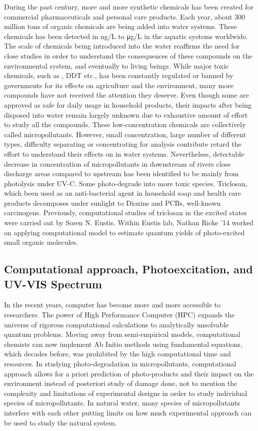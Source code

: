 \documentclass[
journal=jpcbfk, %
manuscript=article]{achemso}
\begin{document}
During the past century, more and more synthetic chemicals has been created for commercial pharmaceuticals and personal care products. Each year, about 300 million tons of organic chemicals are being added into water systems.\cite{Schwarzenbach2006} These chemicals has been detected in ng/L to μg/L in the aquatic systems worldwide.\cite{Monteiro2010} The scale of chemicals being introduced into the water reaffirms the need for close studies in order to understand the consequences of these compounds on the environmental system, and eventually to living beings. While major toxic chemicals, such as , DDT etc., has been constantly regulated or banned by governments for its effects on agriculture and the environment, many more compounds have not received the attention they deserve. Even though some are approved as safe for daily usage in household products, their impacts after being disposed into water remain largely unknown due to exhaustive amount of effort to study all the compounds. These low-concentration chemicals are collectively called micropollutants. However, small concentration, large number of different types, difficulty separating or concentrating for analysis contribute retard the effort to understand their effects on in water systems. Nevertheless, detectable decrease in concentration of micropollutants in downstream of rivers close discharge areas compared to upstream has been identified to be mainly from photolysis under UV-C.\cite{Conley2008,Daneshvar2010,Bonvin2011,Carlson2015} Some photo-degrade into more toxic species. Triclosan, which been used as an anti-bacterial agent in household soap and health care products decomposes under sunlight to Dioxins and PCBs, well-known carcinogens.\cite{Bedoux2012} Previously, computational studies of triclosan in the excited states were carried out by Soren N. Eustis.\cite{Kliegman2013} Within Eustis lab, Nathan Ricke '14 worked on applying computational model to estimate quantum yields of photo-excited small organic molecules.\cite{Ricke2014} 

\subsection{Computational approach, Photoexcitation, and UV-VIS Spectrum}
In the recent years, computer has become more and more accessible to researchers.\cite{Dykstra2011} The power of High Performance Computer (HPC) expands the universe of rigorous computational calculations to analytically unsolvable quantum problems. Moving away from semi-empirical models, computational chemists can now implement Ab Initio methods using fundamental equations, which decades before, was prohibited by the high computational time and resources. In studying photo-degradation in micropollutants, computational approach allows for a priori prediction of photo-products and their impact on the environment instead of posteriori study of damage done, not to mention the complexity and limitations of experimental designs in order to study individual species of micropollutants. In natural water, many species of micropollutants interfere with each other putting limits on how much experimental approach can be used to study the natural system. 
\end{document}
